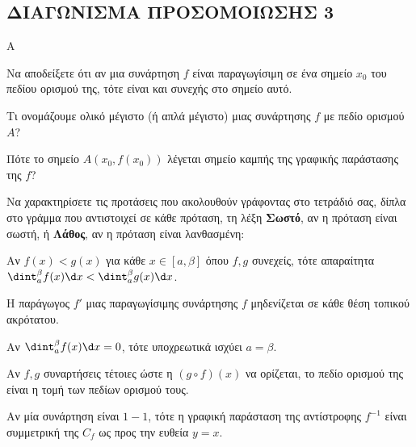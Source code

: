 \newpage
\subsection{ΔΙΑΓΩΝΙΣΜΑ ΠΡΟΣΟΜΟΙΩΣΗΣ 3}
\begin{thema}{Α}
\begin{erwthma}
    \item Να αποδείξετε ότι αν μια συνάρτηση $f$ είναι παραγωγίσιμη σε ένα σημείο $x_0$ του πεδίου ορισμού της, τότε είναι και συνεχής στο σημείο αυτό. 
    \item Τι ονομάζουμε ολικό μέγιστο (ή απλά μέγιστο) μιας συνάρτησης $f$ με πεδίο ορισμού $A$? 
    \item Πότε το σημείο $A(x_0, f(x_0))$ λέγεται σημείο καμπής της γραφικής παράστασης της $f$? 
    \item Να χαρακτηρίσετε τις προτάσεις που ακολουθούν γράφοντας στο τετράδιό σας, δίπλα στο γράμμα που αντιστοιχεί σε κάθε πρόταση, τη λέξη \textbf{Σωστό},
αν η πρόταση είναι σωστή, ή \textbf{Λάθος}, αν η πρόταση είναι λανθασμένη:
    \begin{alist}
        \item Αν $f(x) < g(x)$ για κάθε $x \in [a, \beta]$ όπου $f,g$ συνεχείς, τότε απαραίτητα $\dint_a^\beta f(x) \d x < \dint_a^\beta g(x) \d x$.
        \item Η παράγωγος $f'$ μιας παραγωγίσιμης συνάρτησης $f$ μηδενίζεται σε κάθε θέση τοπικού ακρότατου.
        \item Αν $\dint_a^\beta f(x)\d x = 0$, τότε υποχρεωτικά ισχύει $a = \beta$.
        \item Αν $f, g$ συναρτήσεις τέτοιες ώστε η $(g \circ f)(x)$ να ορίζεται, το πεδίο ορισμού της είναι η τομή των πεδίων ορισμού τους.
        \item Αν μία συνάρτηση είναι $1-1$, τότε η γραφική παράσταση της αντίστροφης $f^{-1}$ είναι συμμετρική της $C_f$ ως προς την ευθεία $y=x$.
    \end{alist} 
\end{erwthma}
\end{thema}

